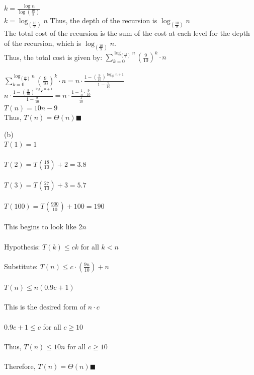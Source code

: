 \documentclass[15pt]{article}
\begin{document}
\begin{enumerate}
{$k = \frac{\log n }{\log (\frac{10}{9})}$ \\
$k = \log_{(\frac{10}{9})} n$ \hspace{2cm} Thus, the depth of the recursion is $\log_{(\frac{10}{9})} n$ \\
The total cost of the recursion is the sum of the cost at each level for the depth of the recursion, which is $\log_{(\frac{10}{9})} n$. \\
Thus, the total cost is given by: $\sum^{\log_{(\frac{10}{9})}n}_{k{=}0} (\frac{9}{10})^k \cdot n$  \\\\
$\sum^{\log_{(\frac{10}{9})}n}_{k{=}0} (\frac{9}{10})^k \cdot n = n \cdot \frac{1-(\frac{9}{10})^{\log_{\frac{10}{9}}n+1}}{1-\frac{9}{10}}$\\
$n \cdot \frac{1-(\frac{9}{10})^{\log_{\frac{10}{9}}n+1}}{1-\frac{9}{10}} = n\cdot\frac{1-\frac{1}{n}\cdot\frac{9}{10}}{\frac{1}{10}}$\\
$T(n) = 10n - 9$\\
Thus, $T(n) = \Theta(n)$$\blacksquare$\\

\newpage

(b)\\

$T(1) = 1$ \\\\
$T(2) = T(\frac{18}{10}) + 2 = 3.8$ \\\\
$T(3) = T(\frac{27}{10}) + 3 = 5.7$ \\\\
$T(100) = T(\frac{900}{10}) + 100 = 190$ \\\\
This begins to look like $2n$ \\\\
Hypothesis: $T(k) \leq ck$ for all $k < n$\\\\
Substitute: $T(n) \leq c \cdot (\frac{9n}{10}) + n$\\\\
$T(n) \leq n(0.9c+1)$\\\\
This is the desired form of $n \cdot c$\\\\
$0.9c + 1 \leq c$ \hspace{2cm} for all $c\geq10$ \\\\
Thus, $T(n) \leq 10n$ \hspace{2cm} for all $c\geq10$\\\\
Therefore, $T(n) = \Theta(n)$$\blacksquare$\\\\

}
\end{enumerate}
\end{document}
